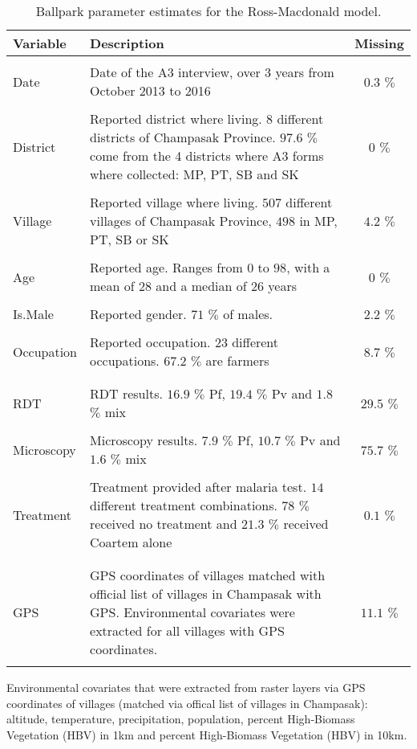 \documentclass{article}\usepackage[]{graphicx}\usepackage[]{color}
\begin{document}
\begin{table}[htp]
\begin{center}
\begin{tabular}{lp{11cm}c}
Variable & Description & Missing \\ \hline
&& \\
Date & Date of the A3 interview, over 3 years from October 2013 to 2016 & \(0.3\) $\%$ \\
&& \\
District & Reported district where living. \(8\) different districts of Champasak Province. \(97.6\) $\%$ come from the 4 districts where A3 forms where collected: MP, PT, SB and SK & \(0\) $\%$ \\
&& \\
Village & Reported village where living. \(507\) different villages of Champasak Province, \(498\) in MP, PT, SB or SK & \(4.2\) $\%$ \\ 
&& \\
Age & Reported age. Ranges from \(0\) to \(98\), with a mean of \(28\) and a median of \(26\) years & \(0\) $\%$ \\ 
&& \\
Is.Male & Reported gender. \(71\) $\%$ of males. & \(2.2\) $\%$ \\ 
&& \\
Occupation & Reported occupation. \(23\) different occupations. \(67.2\) $\%$ are farmers & \(8.7\) $\%$ \\ 
&& \\ \hline
&& \\
RDT & RDT results. \(16.9\) $\%$ Pf, \(19.4\) $\%$ Pv and \(1.8\) $\%$ mix & \(29.5\) $\%$ \\ 
&& \\
Microscopy & Microscopy results. \(7.9\) $\%$ Pf, \(10.7\) $\%$ Pv and \(1.6\) $\%$ mix & \(75.7\) $\%$ \\ 
&& \\
Treatment & Treatment provided after malaria test. \(14\) different treatment combinations. \(78\) $\%$ received no treatment and \(21.3\) $\%$ received Coartem alone & \(0.1\) $\%$ \\ 
&& \\ \hline
&& \\
GPS & GPS coordinates of villages matched with official list of villages in Champasak with GPS. Environmental covariates were extracted for all villages with GPS coordinates. & \(11.1\) $\%$ \\ 
&& \\ \hline

\end{tabular}
\caption{Ballpark parameter estimates for the Ross-Macdonald model.}
\label{table:tableTransmissionModel}
\end{center}
\end{table}

Environmental covariates that were extracted from raster layers via GPS coordinates of villages (matched via offical list of villages in Champasak): altitude, temperature, precipitation, population, percent High-Biomass Vegetation (HBV) in 1km and percent High-Biomass Vegetation (HBV) in 10km.
\end{document}
